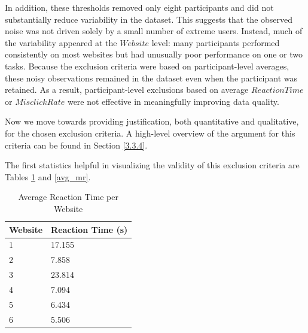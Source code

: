 \documentclass[12pt,twoside]{reedthesis}
\begin{document}
    In addition, these thresholds removed only eight participants and did not substantially reduce variability in the dataset. This suggests that the observed noise was not driven solely by a small number of extreme users. Instead, much of the variability appeared at the $Website$ level: many participants performed consistently on most websites but had unusually poor performance on one or two tasks. Because the exclusion criteria were based on participant-level averages, these noisy observations remained in the dataset even when the participant was retained. As a result, participant-level exclusions based on average $ReactionTime$ or $MisclickRate$ were not effective in meaningfully improving data quality.

    Now we move towards providing justification, both quantitative and qualitative, for the chosen exclusion criteria. A high-level overview of the argument for this criteria can be found in Section \ref{3.3.4}.

    The first statistics helpful in visualizing the validity of this exclusion criteria are Tables \ref{avg_speed} and \ref{avg_mr}. 

    \begin{table}[h!]
            \centering
            \begin{tabular}{| p{3.5cm} | p{3.5cm} |}
                \hline
                Website & Reaction Time (s)\\
                \hline
                1 & 17.155\\
                \hline
                2 & 7.858\\
                \hline
                3 & 23.814\\
                \hline
                4 & 7.094\\
                \hline
                5 & 6.434\\
                \hline
                6 & 5.506\\
                \hline
            \end{tabular}
            \caption{Average Reaction Time per Website}
            \label{avg_speed}
        \end{table}
\end{document}
